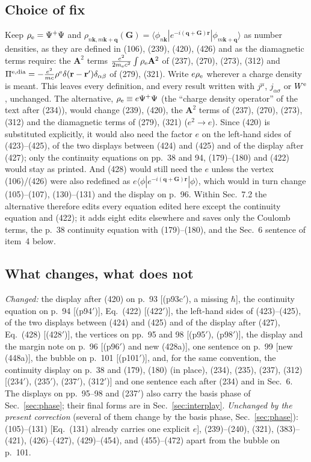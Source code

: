 \documentclass[11pt]{article}
\begin{document}
\subsection{Choice of fix}
Keep $\rho_{\rm e}=\Psi^+\Psi$ and $\rho_{n\mathbf k,m\mathbf k+\mathbf q}(\mathbf G)=\langle\phi_{n\mathbf k}|
e^{-i(\mathbf q+\mathbf G)\mathbf r}|\phi_{m\mathbf k+\mathbf q}\rangle$ as number densities, as they are defined
in (106), (239), (420), (426) and as the diamagnetic terms require: the $\mathbf A^2$ terms
$\frac{e^2}{2m_{\rm e}c^2}\int\rho_{\rm e}\mathbf A^2$ of (237), (270), (273), (312) and
$\Pi^{\rm e,dia}=-\frac{e^2}{mc}\rho^{\rm e}\delta(\mathbf r-\mathbf r')\delta_{\alpha\beta}$ of (279), (321).
Write $e\rho_{\rm e}$ wherever a charge density is meant. This leaves every definition, and every result
written with $j^\mu$, $j_{\alpha\sigma}$ or $W^{\rm e}$, unchanged. The alternative,
$\rho_{\rm e}\equiv e\Psi^+\Psi$ (the ``charge density operator'' of the text after (234)), would change
(239), (420), the $\mathbf A^2$ terms of (237), (270), (273), (312) and the diamagnetic terms of (279),
(321) ($e^2\to e$). Since (420) is substituted explicitly, it would also need the factor $e$ on the
left-hand sides of (423)--(425), of the two displays between (424) and (425) and of the display after
(427); only the continuity equations on pp.~38 and 94, (179)--(180) and (422) would stay as printed. And
(428) would still need
the $e$ unless the vertex (106)/(426) were also redefined as $e\langle\phi|e^{-i(\mathbf q+\mathbf G)\mathbf r}|
\phi\rangle$, which would in turn change (105)--(107), (130)--(131) and the display on p.~96. Within
Sec.~7.2 the alternative therefore edits every equation edited here except the continuity equation and
(422); it adds eight edits elsewhere and saves only the Coulomb terms, the p.~38 continuity equation with
(179)--(180), and the Sec.~6 sentence of item~4 below.

\subsection{What changes, what does not}
\emph{Changed:} the display after (420) on p.~93 [(p93c$'$), a missing $\hbar$], the continuity equation on
p.~94 [(p94$'$)], Eq.~(422) [(422$'$)], the left-hand sides of (423)--(425), of the two displays between
(424) and (425) and of the display after (427), Eq.~(428) [(428$'$)], the vertices on pp.~95 and 98
[(p95$'$), (p98$'$)], the display and the margin note on p.~96 [(p96$'$) and new (428a)], one sentence on
p.~99 [new (448a)], the bubble on p.~101 [(p101$'$)], and, for the same convention, the continuity
display on p.~38 and (179), (180) (in place), (234), (235), (237), (312) [(234$'$), (235$'$), (237$'$),
(312$'$)] and one sentence each after (234) and in Sec.~6. The displays on pp.~95--98 and
(237$'$) also carry the basis phase of Sec.~\ref{sec:phase}; their final forms are in
Sec.~\ref{sec:interplay}. \emph{Unchanged by the present correction} (several of them change by the basis
phase, Sec.~\ref{sec:phase}): (105)--(131) [Eq.~(131) already carries one explicit $e$], (239)--(240),
(321), (383)--(421), (426)--(427), (429)--(454), and (455)--(472) apart from the bubble on p.~101.
\end{document}
